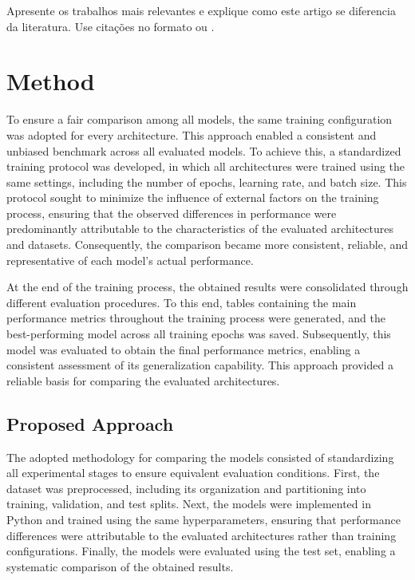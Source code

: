 \documentclass[11pt,a4paper]{article}
\begin{document}
Apresente os trabalhos mais relevantes e explique como este artigo se diferencia
da literatura. Use citações no formato \citep{exemplo2024} ou \citet{exemplo2024}.

\section{Method}
\label{sec:method}


To ensure a fair comparison among all models, the same training configuration was adopted for every architecture. This approach enabled a consistent and unbiased benchmark across all evaluated models. To achieve this, a standardized training protocol was developed, in which all architectures were trained using the same settings, including the number of epochs, learning rate, and batch size. This protocol sought to minimize the influence of external factors on the training process, ensuring that the observed differences in performance were predominantly attributable to the characteristics of the evaluated architectures and datasets. Consequently, the comparison became more consistent, reliable, and representative of each model's actual performance.


At the end of the training process, the obtained results were consolidated through different evaluation procedures. To this end, tables containing the main performance metrics throughout the training process were generated, and the best-performing model across all training epochs was saved. Subsequently, this model was evaluated to obtain the final performance metrics, enabling a consistent assessment of its generalization capability. This approach provided a reliable basis for comparing the evaluated architectures.


\subsection{Proposed Approach}
\label{sec:approach}

The adopted methodology for comparing the models consisted of standardizing all experimental stages to ensure equivalent evaluation conditions. First, the dataset was preprocessed, including its organization and partitioning into training, validation, and test splits. Next, the models were implemented in Python and trained using the same hyperparameters, ensuring that performance differences were attributable to the evaluated architectures rather than training configurations. Finally, the models were evaluated using the test set, enabling a systematic comparison of the obtained results.
\end{document}

